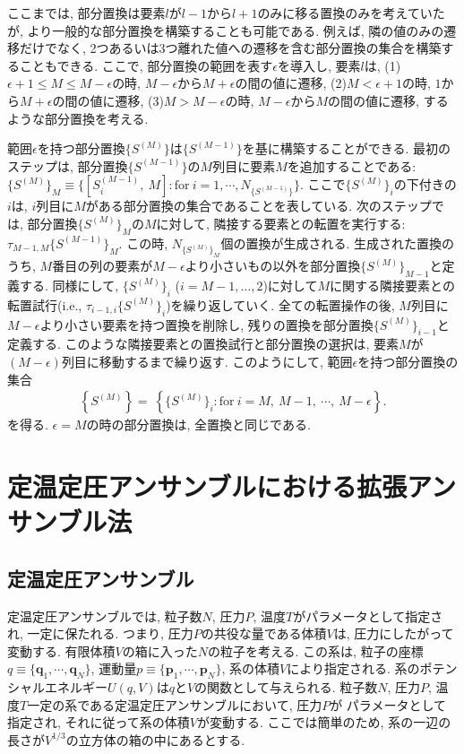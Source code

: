 ここまでは, 部分置換は要素$l$が$l-1$から$l+1$のみに移る置換のみを考えていたが, より一般的な部分置換を構築することも可能である. 
例えば, 隣の値のみの遷移だけでなく, 2つあるいは3つ離れた値への遷移を含む部分置換の集合を構築することもできる. 
ここで, 部分置換の範囲を表す$\epsilon$を導入し, 要素$l$は, 
(1)$\epsilon+1 \le M \le M-\epsilon$の時, $M-\epsilon$から$M+\epsilon$の間の値に遷移, 
(2)$M < \epsilon+1$の時, $1$から$M+\epsilon$の間の値に遷移, 
(3)$M > M-\epsilon$の時, $M-\epsilon$から$M$の間の値に遷移, 
するような部分置換を考える. 

範囲$\epsilon$を持つ部分置換$\{S^{(M)}\}$は$\{S^{(M-1)}\}$を基に構築することができる. 
最初のステップは, 部分置換$\{S^{(M-1)}\}$の$M$列目に要素$M$を追加することである:
$\{S^{(M)}\}_{M} \equiv \{ [S_{i}^{(M-1)},~ M] \mathrm{ : for }~ i = 1, \cdots, N_{\{S^{(M-1)}\}} \}$.
ここで$\{S^{(M)}\}_{i}$の下付きの$i$は, $i$列目に$M$がある部分置換の集合であることを表している. 
次のステップでは, 部分置換$\{S^{(M)}\}_{M}$の$M$に対して, 隣接する要素との転置を実行する:
$\tau_{M-1, M} \{S^{(M-1)}\}_{M}$. 
この時, $N_{\{S^{(M)}\}_{M}}$個の置換が生成される. 
生成された置換のうち, $M$番目の列の要素が$M-\epsilon$より小さいもの以外を部分置換$\{S^{(M)}\}_{M-1}$と定義する. 
同様にして, $\{S^{(M)}\}_{i}$ ($i = M-1,\dots,2$)に対して$M$に関する隣接要素との転置試行(i.e., $\tau_{i-1,i} \{S^{(M)}\}_{i}$)を繰り返していく. 
全ての転置操作の後, $M$列目に$M-\epsilon$より小さい要素を持つ置換を削除し, 残りの置換を部分置換$\{S^{(M)}\}_{i-1}$と定義する. 
このような隣接要素との置換試行と部分置換の選択は, 要素$M$が$(M-\epsilon)$列目に移動するまで繰り返す. 
このようにして, 範囲$\epsilon$を持つ部分置換の集合
\begin{align}
	\left\{S^{(M)}\right\} = ~
	\left\{
			\{S^{(M)}\}_{i}
			 \mathrm{ : for } ~i = M,~ M-1,~ \cdots,~ M-\epsilon
	\right\}.
\end{align}
を得る. $\epsilon = M$の時の部分置換は, 全置換と同じである. 

\section{定温定圧アンサンブルにおける拡張アンサンブル法}
\subsection{定温定圧アンサンブル}
定温定圧アンサンブルでは, 粒子数$N$, 圧力$P$, 温度$T$がパラメータとして指定され, 
一定に保たれる.
つまり, 圧力$P$の共役な量である体積$V$は, 圧力にしたがって変動する.
有限体積$V$の箱に入った$N$の粒子を考える.
この系は, 粒子の座標$q \equiv \{\mathbf{q}_{1}, \cdots, \mathbf{q}_{N}\}$, 
運動量$p \equiv \{\mathbf{p}_{1}, \cdots, \mathbf{p}_{N}\}$,
系の体積$V$により指定される.
系のポテンシャルエネルギー$U(q, V)$は$q$と$V$の関数として与えられる.
粒子数$N$, 圧力$P$, 温度$T$一定の系である定温定圧アンサンブルにおいて, 圧力$P$が
パラメータとして指定され, それに従って系の体積$V$が変動する.
ここでは簡単のため, 系の一辺の長さが$V^{1/3}$の立方体の箱の中にあるとする.

